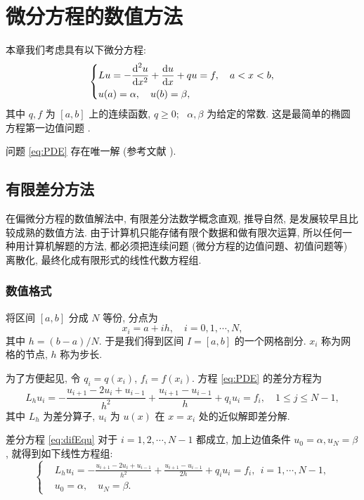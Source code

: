 

\chapter{微分方程的数值方法}

本章我们考虑具有以下微分方程:
\begin{equation}\label{eq:PDE}
\left\{\begin{aligned}
& Lu=-\frac{{\mathop{}\!\mathrm{d}}^{2} u}{\mathop{}\!\mathrm{d} x^{2}}+\frac{\mathop{}\!\mathrm{d} u}{\mathop{}\!\mathrm{d} x}+qu=f, \quad a < x < b, \\
& u(a)=\alpha, \quad u(b)=\beta,
\end{aligned}\right.
\end{equation}
其中 $q, f$ 为 $[a,b]$ 上的连续函数, $q \geqslant 0$;~ $\alpha, \beta$ 为给定的常数. 这是最简单的椭圆方程第一边值问题 .

问题 \eqref{eq:PDE} 存在唯一解 (参考文献 \cite{LiLiu1997}).


\section{有限差分方法}
在偏微分方程的数值解法中, 有限差分法数学概念直观, 推导自然, 是发展较早且比较成熟的数值方法. 由于计算机只能存储有限个数据和做有限次运算, 所以任何一种用计算机解题的方法, 都必须把连续问题 (微分方程的边值问題、初值问题等) 离散化, 最终化成有限形式的线性代数方程组.

\subsection{数值格式}
将区间 $[a,b]$ 分成 $N$ 等份, 分点为
\begin{equation*}
  x_{i} = a+ih, \quad i=0,1, \cdots, N,
\end{equation*}
其中 $h=(b-a)/N$. 于是我们得到区间 $I=[a,b]$ 的一个网格剖分. $x_i$ 称为网格的节点, $h$ 称为步长.

为了方便起见, 令 $q_{i}=q(x_{i})$, $f_{i}=f(x_{i})$. 方程 \eqref{eq:PDE} 的差分方程为
\begin{equation}\label{eq:difEqu}
  L_{h} u_{i}=-\frac{u_{i+1}-2 u_{i}+u_{i-1}}{h^{2}}+\frac{u_{i+1}-u_{i-1}}{h}+q_{i} u_{i}=f_{i},\quad 1 \leqslant j \leqslant N-1,
\end{equation}
其中 $L_{h}$ 为差分算子, $u_i$ 为 $u(x)$ 在 $x=x_i$ 处的近似解即差分解.

差分方程 \eqref{eq:difEqu} 对于 $i=1,2, \cdots, N-1$ 都成立, 加上边值条件 $u_{0}=\alpha, u_{N}=\beta$, 就得到如下线性方程组:
\begin{equation}\label{eq:fdm}
\left\{\begin{aligned}
& L_{h} u_{i}=-\frac{u_{i+1}-2 u_{i}+u_{i-1}}{h^{2}}+\frac{u_{i+1}-u_{i-1}}{2h}+q_{i} u_{i}=f_{i}, ~~ i=1, \cdots, N-1, \\
& u_{0}=\alpha, \quad u_{N}=\beta.
\end{aligned}\right.
\end{equation}

